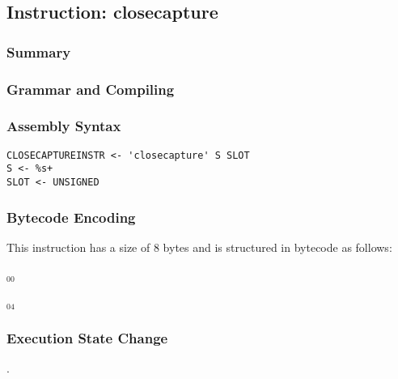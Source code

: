 \subsection{Instruction: closecapture}

\subsubsection{Summary}


\subsubsection{Grammar and Compiling}


\subsubsection{Assembly Syntax}

\begin{myquote}
\begin{verbatim}
CLOSECAPTUREINSTR <- 'closecapture' S SLOT
S <- %s+
SLOT <- UNSIGNED
\end{verbatim}
\end{myquote}


\subsubsection{Bytecode Encoding}

This instruction has a size of 8 bytes and is structured in bytecode as follows:

$_{00}$\ 



$_{04}$\ 


\subsubsection{Execution State Change}

.


